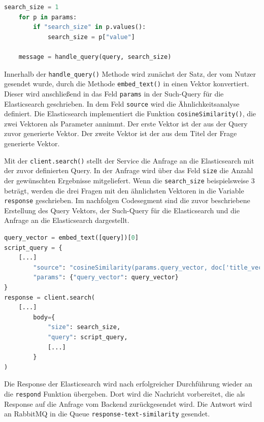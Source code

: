 \begin{lstlisting}[language=Python, caption={Auslesen der search\_{}size und Ausführen der KI}]
search_size = 1
    for p in params:
        if "search_size" in p.values():
            search_size = p["value"]

    message = handle_query(query, search_size)
\end{lstlisting}

Innerhalb der \texttt{handle\_{}query()} Methode wird zunächst der Satz, der vom Nutzer gesendet wurde, durch die Methode \texttt{embed\_{}text()} in einen Vektor konvertiert. Dieser wird anschließend in das Feld \texttt{\glqq params\grqq{}} in der Such-Query für die Elasticsearch geschrieben. In dem Feld \texttt{\glqq source\grqq{}} wird die Ähnlichkeitsanalyse definiert. Die Elasticsearch implementiert die Funktion \texttt{cosineSimilarity()}, die zwei Vektoren als Parameter annimmt. Der erste Vektor ist der  aus der Query zuvor generierte Vektor. Der zweite Vektor ist der aus dem Titel der Frage generierte Vektor. 

Mit der \texttt{client.search()} stellt der Service die Anfrage an die Elasticsearch mit der zuvor definierten Query. In der Anfrage wird über das Feld \texttt{\glqq size\grqq} die Anzahl der gewünschten Ergebnisse mitgeliefert. Wenn die \texttt{search\_{}size} beispielsweise 3 beträgt, werden die drei Fragen mit den ähnlichsten Vektoren in die Variable \texttt{response} geschrieben. Im nachfolgen Codesegment sind die zuvor beschriebene Erstellung des Query Vektors, der Such-Query für die Elasticsearch und die Anfrage an die Elasticsearch dargestellt.

\begin{lstlisting}[language=Python, caption={Ähnlichkeitssuche in der Elasticsearch}]
query_vector = embed_text([query])[0]
script_query = {
    [...]
        "source": "cosineSimilarity(params.query_vector, doc['title_vector']) + 1.0",
        "params": {"query_vector": query_vector}  
}
response = client.search(
    [...]
        body={
            "size": search_size,
            "query": script_query,
            [...]
        }
)
\end{lstlisting}

Die Response der Elasticsearch wird nach erfolgreicher Durchführung wieder an die \texttt{respond} Funktion übergeben. Dort wird die Nachricht vorbereitet, die als Response auf die Anfrage vom Backend zurückgesendet wird. Die Antwort wird an RabbitMQ in die Queue \texttt{response-text-similarity} gesendet.

